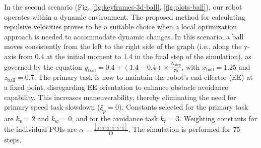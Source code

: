 \documentclass[letterpaper, 10 pt, conference]{ieeeconf}  %
\begin{document}
In the second scenario (Fig. \ref{fig:keyframes-3d-ball}, \ref{fig:plots-ball}), our robot operates within a dynamic environment. The proposed method for calculating repulsive velocities proves to be a suitable choice when a local optimization approach is needed to accommodate dynamic changes. In this scenario, a ball moves consistently from the left to the right side of the graph (i.e., along the y-axis from 0.4 at the initial moment to 1.4 in the final step of the simulation), as governed by the equation \( y_{\text{ball}} = 0.4 + (1.4 - 0.4) \times \frac{N_{\text{step}}}{75} \),  with \( x_{\text{ball}} = 1.25 \) and \( z_{\text{ball}} = 0.7 \). The primary task is now to maintain the robot's end-effector (EE) at a fixed point, disregarding EE orientation to enhance obstacle avoidance capability. This increases maneuverability, thereby eliminating the need for primary speed task slowdown (\( \xi_{p} = 0 \)). Constants selected for the primary task are \( k_v = 2 \) and \( k_w = 0 \), and for the avoidance task \( k_r = 3 \). Weighting constants for the individual POIs are \( \alpha = \frac{[ \frac{1}{5}, \frac{1}{5}, \frac{1}{5}, \frac{1}{5}, \frac{1}{5}, \frac{1}{5} ]}{10} \). The simulation is performed for 75 steps. 


\end{document}
